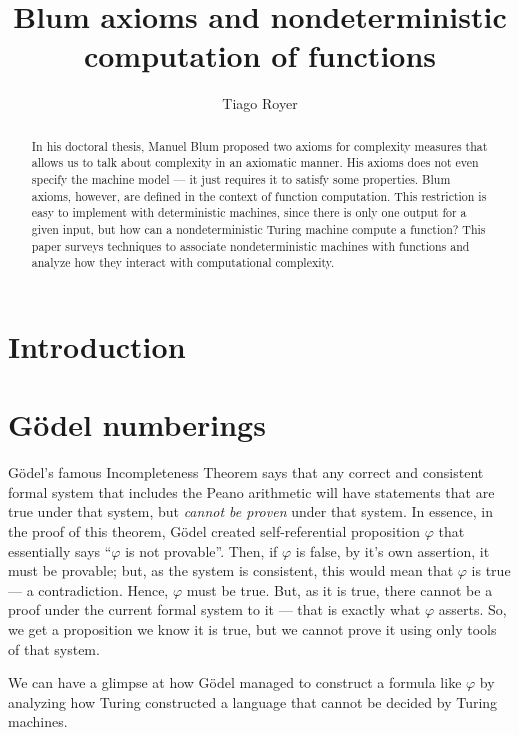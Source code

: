 \documentclass[12pt]{article}
\title{Blum axioms and nondeterministic computation of functions}
\author{Tiago Royer\inst{1}}
\theoremstyle{definition}
\begin{document}
\maketitle

\begin{abstract}
    In his doctoral thesis,
    Manuel Blum proposed two axioms for complexity measures
    that allows us to talk about complexity in an axiomatic manner.
    His axioms does not even specify the machine model
    --- it just requires it to satisfy some properties.
    Blum axioms, however,
    are defined in the context of function computation.
    This restriction is easy to implement with deterministic machines,
    since there is only one output for a given input,
    but how can a nondeterministic Turing machine compute a function?
    This paper surveys techniques to associate
    nondeterministic machines with functions
    and analyze how they interact with computational complexity.
\end{abstract}

\section{Introduction}

\section{Gödel numberings}


Gödel's famous Incompleteness Theorem says that
any correct and consistent formal system that includes the Peano arithmetic
will have statements that are true under that system,
but \emph{cannot be proven} under that system.
In essence,
in the proof of this theorem,
Gödel created self-referential proposition $\varphi$
that essentially says ``$\varphi$ is not provable''.
Then, if $\varphi$ is false,
by it's own assertion, it must be provable;
but, as the system is consistent,
this would mean that $\varphi$ is true
--- a contradiction.
Hence, $\varphi$ must be true.
But, as it is true,
there cannot be a proof under the current formal system to it
--- that is exactly what $\varphi$ asserts.
So,
we get a proposition we know it is true,
but we cannot prove it using only tools of that system.

We can have a glimpse at how Gödel managed to construct a formula like $\varphi$
by analyzing how Turing constructed a language
that cannot be decided by Turing machines.
\end{document}
